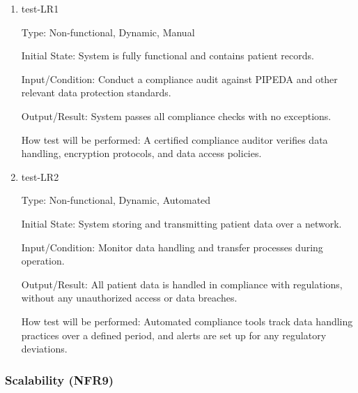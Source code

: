 \documentclass[12pt, titlepage]{article}
\begin{document}
\begin{enumerate}
    \item{test-LR1} \label{test-LR1}
    
    Type: Non-functional, Dynamic, Manual
    
    Initial State: System is fully functional and contains patient records.
    
    Input/Condition: Conduct a compliance audit against PIPEDA and other relevant data protection standards.
    
    Output/Result: System passes all compliance checks with no exceptions.
    
    How test will be performed: A certified compliance auditor verifies data handling, encryption protocols, and data access policies.

    \item{test-LR2} \label{test-LR2}
    
    Type: Non-functional, Dynamic, Automated
    
    Initial State: System storing and transmitting patient data over a network.
    
    Input/Condition: Monitor data handling and transfer processes during operation.
    
    Output/Result: All patient data is handled in compliance with regulations, without any unauthorized access or data breaches.
    
    How test will be performed: Automated compliance tools track data handling practices over a defined period, and alerts are set up for any regulatory deviations.
\end{enumerate}

\subsubsection{Scalability (NFR9)} \label{section:4.2.9}
\end{document}
